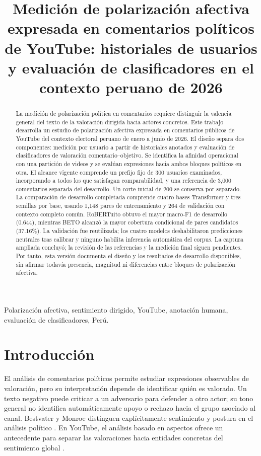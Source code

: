 \documentclass[conference,letterpaper]{IEEEtran}
\title{Medición de polarización afectiva expresada en comentarios políticos de YouTube: historiales de usuarios y evaluación de clasificadores en el contexto peruano de 2026}
\author{\IEEEauthorblockN{Jose Alva Cornejo}\IEEEauthorblockA{Universidad Nacional de San Agustín de Arequipa\\Arequipa, Perú}}
\begin{document}
\maketitle
\begin{abstract}
La medición de polarización política en comentarios requiere distinguir la valencia general del texto de la valoración dirigida hacia actores concretos. Este trabajo desarrolla un estudio de polarización afectiva expresada en comentarios públicos de YouTube del contexto electoral peruano de enero a junio de 2026. El diseño separa dos componentes: medición por usuario a partir de historiales anotados y evaluación de clasificadores de valoración comentario--objetivo. Se identifica la afinidad operacional con una partición de videos y se evalúan expresiones hacia ambos bloques políticos en otra. El alcance vigente comprende un prefijo fijo de 300 usuarios examinados, incorporando a todos los que satisfagan comparabilidad, y una referencia de 3,000 comentarios separada del desarrollo. Un corte inicial de 200 se conserva por separado. La comparación de desarrollo completada comprende cuatro bases Transformer y tres semillas por base, usando 1,148 pares de entrenamiento y 264 de validación con contexto completo común. RoBERTuito obtuvo el mayor macro-F1 de desarrollo (0.644), mientras BETO alcanzó la mayor cobertura condicional de pares candidatos (37.16\%). La validación fue reutilizada; los cuatro modelos deshabilitaron predicciones neutrales tras calibrar y ninguno habilita inferencia automática del corpus. La captura ampliada concluyó; la revisión de las referencias y la medición final siguen pendientes. Por tanto, esta versión documenta el diseño y los resultados de desarrollo disponibles, sin afirmar todavía presencia, magnitud ni diferencias entre bloques de polarización afectiva.
\end{abstract}
\begin{IEEEkeywords}
Polarización afectiva, sentimiento dirigido, YouTube, anotación humana, evaluación de clasificadores, Perú.
\end{IEEEkeywords}

\section{Introducción}
El análisis de comentarios políticos permite estudiar expresiones observables de valoración, pero su interpretación depende de identificar quién es valorado. Un texto negativo puede criticar a un adversario para defender a otro actor; su tono general no identifica automáticamente apoyo o rechazo hacia el grupo asociado al canal. Bestvater y Monroe distinguen explícitamente sentimiento y postura en el análisis político \cite{BestvaterMonroe2023}. En YouTube, el análisis basado en aspectos ofrece un antecedente para separar las valoraciones hacia entidades concretas del sentimiento global \cite{Miehling2025}.
\end{document}

